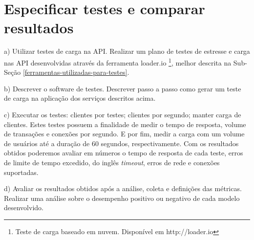 \section{Especificar testes e comparar resultados}

  \begin{compactitem}
    \item[a)] Utilizar testes de carga na \ac{API}. Realizar um plano de testes de 
    estresse e carga nas \ac{API} desenvolvidas através
    da ferramenta loader.io \footnote[7]{Teste de carga baseado em nuvem. Disponível em http://loader.io},
    melhor descrita na Sub-Seção \ref{ferramentas-utilizadas-para-testes}.
    
    \item[b)] Descrever o software de testes. Descrever passo a passo como gerar um teste de carga 
    na aplicação dos serviços descritos acima.
    
    \item[c)] Executar os testes: clientes por testes; clientes por segundo; manter carga de clientes.
    Estes testes possuem a finalidade de medir o tempo de resposta, volume de transações e conexões por segundo. E por fim, 
    medir a carga com um volume de usuários até a duração de 60 segundos, respectivamente. 
    Com os resultados obtidos poderemos avaliar em números o tempo de resposta de cada teste,
    erros de limite de tempo excedido, do inglês \textit{timeout}, erros de rede e conexões suportadas. 
    
    \item[d)] Avaliar os resultados obtidos após a análise, coleta e definições das métricas. Realizar uma análise sobre o 
    desempenho positivo ou negativo de cada modelo desenvolvido.
    
    
  \end{compactitem}



